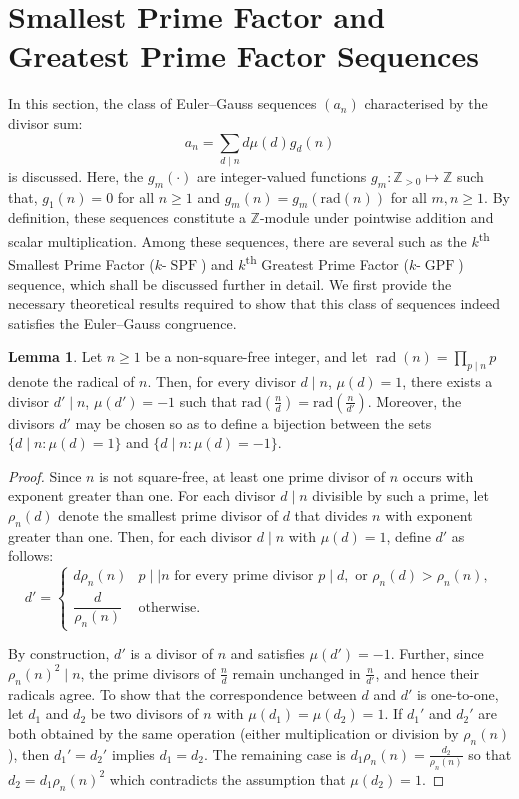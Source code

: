 \documentclass{article}
\numberwithin{equation}{section}
\theoremstyle{definition}
\newtheorem{lemma}[definition]{\bf {Lemma}}
\begin{document}
\section{Smallest Prime Factor and Greatest Prime Factor Sequences}\label{sec:4}
In this section, the class of Euler--Gauss sequences $(a_n)$ characterised by the divisor sum:
\begin{equation}\label{eq:030}
    a_n=\sum_{d\mid n}d\mu(d)g_d(n)
\end{equation}
is discussed. Here, the $g_m(\cdot)$ are integer-valued functions $g_m:\mathbb{Z}_{>0}\mapsto\mathbb{Z}$ such that, $g_1(n)=0$ for all $n\geq1$ and $g_m(n)=g_m(\text{rad}(n))$ for all $m,n\geq1$. By definition, these sequences constitute a $\mathbb{Z}$-module under pointwise addition and scalar multiplication. 
Among these sequences, there are several such as the $k$\textsuperscript{th} Smallest Prime Factor ($k$-$\operatorname{SPF}$) and $k$\textsuperscript{th} Greatest Prime Factor ($k$-$\operatorname{GPF}$) sequence, which shall be discussed further in detail. We first provide the necessary theoretical results required to show that this class of sequences indeed satisfies the Euler--Gauss congruence.
\begin{lemma}\label{lem:04}
Let $n\geq 1$ be a non-square-free integer, and let $\operatorname{rad}(n)=\prod_{p\mid n}p$
denote the radical of $n$. Then, for every divisor $d\mid n$, $\mu(d)=1$, there exists a divisor $d'\mid n$, $\mu(d')=-1$ such that
$\text{rad}\!\left(\frac{n}{d}\right)
=\text{rad}\!\left(\frac{n}{d'}\right)$.
Moreover, the divisors $d'$ may be chosen so as to define a bijection between the sets
$\{d\mid n:\mu(d)=1\}$ and
$\{d\mid n:\mu(d)=-1\}$.
\end{lemma}
\begin{proof}
Since $n$ is not square-free, at least one prime divisor of $n$ occurs with
exponent greater than one. For each divisor $d\mid n$ divisible by such a prime, let $\rho_n(d)$ denote the smallest prime divisor of $d$ that divides $n$ with exponent greater than one. Then, for each divisor $d\mid n$ with $\mu(d)=1$,
define $d'$ as follows:
\[d'=\begin{cases}
d\rho_n(n)&
p\mid\mid n\text{ for every prime divisor }p\mid d,
\text{ or }\rho_n(d)>\rho_n(n),\\[2mm]
\dfrac{d}{\rho_n(n)}&\text{otherwise}.
\end{cases}\]

By construction, $d'$ is a divisor of $n$ and satisfies $\mu(d')=-1$.
Further, since $\rho_n(n)^2\mid n$, the prime divisors of $\frac{n}{d}$ remain unchanged in $\frac{n}{d'}$, and hence their radicals agree.
To show that the correspondence between $d$ and $d'$ is one-to-one, let
$d_1$ and $d_2$ be two divisors of $n$ with $\mu(d_1)=\mu(d_2)=1$. If $d_1'$ and $d_2'$ are both obtained by the same operation (either multiplication or division by $\rho_n(n)$), then
$d_1'=d_2'$ implies $d_1=d_2$. The remaining case is $d_1\rho_n(n)=\frac{d_2}{\rho_n(n)}$
so that $d_2=d_1\rho_n(n)^2$ which contradicts the assumption that $\mu(d_2)=1$.
\end{proof}
\end{document}
